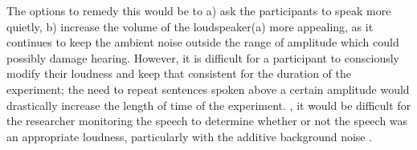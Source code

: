 The \DIFdelbegin {}\DIFdelend \DIFaddbegin {}\DIFaddend options to remedy this would be to a) ask the participants to speak more quietly, \DIFdelbegin {}\DIFdelend b) increase the volume of the loudspeaker\DIFdelbegin {}\DIFdelend \DIFaddbegin {}\DIFaddend (a) \DIFdelbegin {}\DIFdelend \DIFaddbegin {}\DIFaddend more appealing, as it continues to keep the ambient noise outside the range of amplitude which could possibly damage hearing.  However, \DIFaddbegin {}\DIFaddend it is difficult for a participant to consciously modify their loudness \DIFdelbegin \DIFdel{, }\DIFdelend and keep that consistent for the duration of the experiment; the need to repeat sentences spoken above a certain amplitude would drastically increase the length of time of the experiment.  \DIFdelbegin {}\DIFdelend \DIFaddbegin {}\DIFaddend , it would be difficult for the researcher monitoring the speech to determine whether or not the speech was an appropriate loudness, particularly with the additive background noise \DIFaddbegin {}\DIFaddend .  

